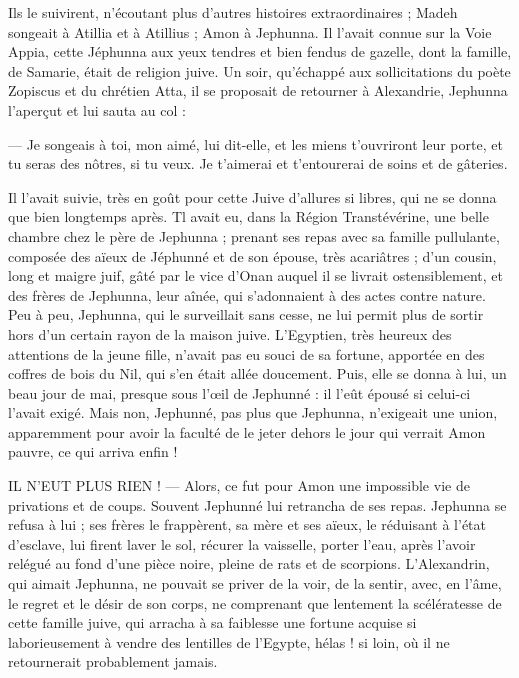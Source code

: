 \documentclass[a4paper, 11pt, oneside, polutonikogreek, french]{article}
\begin{document}
Ils le suivirent, n'écoutant plus d'autres histoires extraordinaires ; Madeh songeait à Atillia et à Atillius ; Amon à Jephunna. Il l'avait connue sur la Voie Appia, cette Jéphunna aux yeux tendres et bien fendus de gazelle, dont la famille, de Samarie, était de religion juive. Un soir, qu'échappé aux sollicitations du poète Zopiscus et du chrétien Atta, il se proposait de retourner à Alexandrie, Jephunna l'aperçut et lui sauta au col :

--- Je songeais à toi, mon aimé, lui dit-elle, et les miens t'ouvriront leur porte, et tu seras des nôtres, si tu veux. Je t'aimerai et t’entourerai de soins et de gâteries.

Il l'avait suivie, très en goût pour cette Juive d'allures si libres, qui ne se donna que bien longtemps après. Tl avait eu, dans la Région Transtévérine, une belle chambre chez le père de Jephunna ; prenant ses repas avec sa famille pullulante, composée des aïeux de Jéphunné et de son épouse, très acariâtres ; d'un cousin, long et maigre juif, gâté par le vice d'Onan auquel il se livrait ostensiblement, et des frères de Jephunna, leur aînée, qui s'adonnaient à des actes contre nature. Peu à peu, Jephunna, qui le surveillait sans cesse, ne lui permit plus de sortir hors d'un certain rayon de la maison juive. L'Egyptien, très heureux des attentions de la jeune fille, n'avait pas eu souci de sa fortune, apportée en des coffres de bois du Nil, qui s'en était allée doucement. Puis, elle se donna à lui, un beau jour de mai, presque sous l'œil de Jephunné : il l'eût épousé si celui-ci l'avait exigé. Mais non, Jephunné, pas plus que Jephunna, n'exigeait une union, apparemment pour avoir la faculté de le jeter dehors le jour qui verrait Amon pauvre, ce qui arriva enfin !

IL N’EUT PLUS RIEN ! --- Alors, ce fut pour Amon une impossible vie de privations et de coups. Souvent Jephunné lui retrancha de ses repas. Jephunna se refusa à lui ; ses frères le frappèrent, sa mère et ses aïeux, le réduisant à l'état d'esclave, lui firent laver le sol, récurer la vaisselle, porter l'eau, après l'avoir relégué au fond d'une pièce noire, pleine de rats et de scorpions. L'Alexandrin, qui aimait Jephunna, ne pouvait se priver de la voir, de la sentir, avec, en l'âme, le regret et le désir de son corps, ne comprenant que lentement la scélératesse de cette famille juive, qui arracha à sa faiblesse une fortune acquise si laborieusement à vendre des lentilles de l'Egypte, hélas ! si loin, où il ne retournerait probablement jamais.
\end{document}

